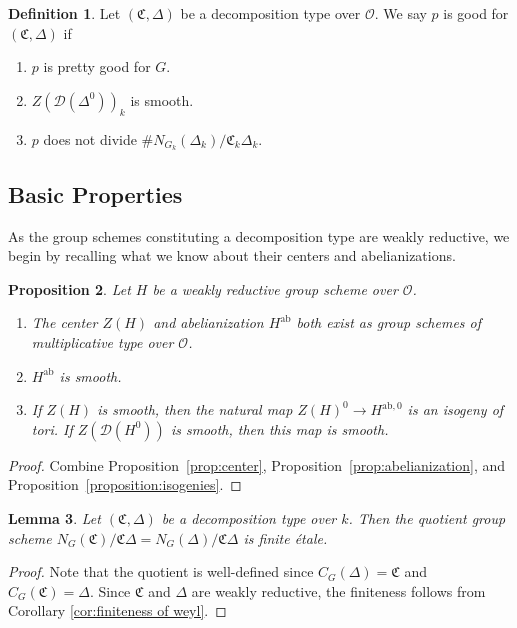 \documentclass[11pt, letterpaper,english]{amsart}
\theoremstyle{plain}
\newtheorem{lem}{Lemma}
\newtheorem{prop}[lem]{Proposition}
\theoremstyle{definition}
\newtheorem{defn}[lem]{Definition}
\numberwithin{equation}{section}
\numberwithin{lem}{section}
\newcommand{\fC}{\mathfrak{C}}
\newcommand{\cO}{\mathcal{O}}
\newcommand{\sD}{{\mathscr D}}
\newcommand{\ab}{\textrm{ab}}
\newcommand{\cent}[2]{C_{#1}(#2)}
\newcommand{\nlz}[2]{N_{#1}(#2)}
\newcommand{\Dt}{\Delta}
\begin{document}
\begin{defn} \label{def:goodprime}
Let $(\fC,\Dt)$ be a decomposition type over $\cO$. We say $p$ is good for $(\fC,\Dt)$ if 
\begin{enumerate}
    \item $p$ is pretty good for $G$.
    \item $Z(\sD(\Dt^{0}))_k$ is smooth. 
    \item $p$ does not divide $\# \nlz{G_k}{\Dt_k}/\fC_k \Dt_k$. 
\end{enumerate}
\end{defn}

\subsection{Basic Properties}

As the group schemes constituting a decomposition type are weakly reductive, we begin by recalling what we know about their centers and abelianizations.

\begin{prop} \label{prop:centers and abelianization}
Let $H$ be a weakly reductive group scheme over $\cO$. 
\begin{enumerate}
    \item The center $Z(H)$ and abelianization $H^{\ab}$ both exist as group schemes of multiplicative type over $\cO$. 
    \item $H^{\ab}$ is smooth.
    \item \label{prop:centers and abelianization3} If $Z(H)$ is smooth, then the natural map $Z(H)^0 \to H^{\ab,0}$ is an isogeny of tori. If $Z(\sD(H^{0}))$ is smooth, then this map is smooth.
\end{enumerate}
\end{prop}

\begin{proof}
Combine 
Proposition~\ref{prop:center}, Proposition~\ref{prop:abelianization}, and Proposition~\ref{proposition:isogenies}.
\end{proof}

%

\begin{lem} \label{lem:martin}
Let $(\fC,\Dt)$ be a decomposition type over $k$. 
Then the quotient group scheme
$\nlz{G}{\fC}/\fC \Dt = \nlz{G}{\Dt}/\fC \Dt$ is finite \'{e}tale.
\end{lem}

\begin{proof}
Note that the quotient is well-defined since $\cent{G}{\Dt}=\fC$ and $\cent{G}{\fC}=\Dt$. 
Since $\fC$ and $\Dt$ are weakly reductive, the finiteness follows from Corollary \ref{cor:finiteness of weyl}. 
\end{proof}
\end{document}
